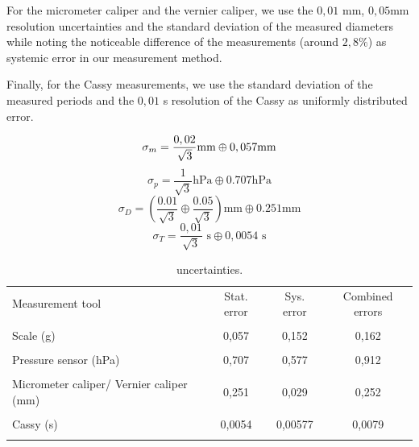 For the micrometer caliper and the vernier caliper, we use the $0,01$ mm, $0,05$mm resolution uncertainties and the standard deviation of the measured diameters while noting the noticeable difference of the measurements (around $2,8 \%$) as systemic error in our measurement method.
\vspace{1em}

Finally, for the Cassy measurements, we use the standard deviation of the measured periods and the $0,01$ s resolution of the Cassy as uniformly distributed error.


$$
\sigma _{m}  =  \frac{0,02}{\sqrt{ 3 }} \text{mm} \\ \oplus \\ 0,057 \text{mm}
$$
$$
\sigma _{p}  =  \frac{1}{\sqrt{ 3 }}\text{hPa} \oplus 0.707\text{hPa}  
$$
$$
\sigma _{D}  =  \left( \frac{0.01}{\sqrt{ 3 }} \oplus  \frac{0.05}{\sqrt{ 3 }}  \right)\text{mm} \oplus 0.251 \text{mm}
$$
$$
\sigma _{T}  =  \frac{0,01}{\sqrt{ 3 }}\text{ s}\oplus 0,0054 \text{ s}
$$


\begin{table}[h]
  \centering
  \begin{tabular}{l|ccc}
    Measurement tool & Stat. error  & Sys. error & Combined errors\\ \\ \hline
     Scale (g) & 0,057 &  0,152& 0,162 \\
           &  &  &  \\ \hline
     Pressure sensor (hPa)& 0,707 & 0,577  & 0,912 \\
           &  &  &  \\ \hline
     Micrometer caliper/ Vernier caliper (mm)&  0,251 &  0,029& 0,252 \\
           &  &  &  \\ \hline
     Cassy (s) & 0,0054 & 0,00577  & 0,0079 \\
           &  &  &  \\ \hline
  \end{tabular}
  \caption{uncertainties.}
  \label{tab:uncertainties in measured quantities}
\end{table}

\vspace{1em}

